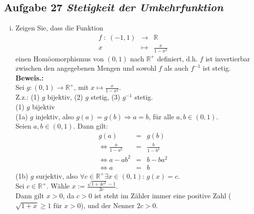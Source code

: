 \subsection*{Aufgabe 27 \mdseries\itshape Stetigkeit der Umkehrfunktion}

\begin{enumerate}[(i)]
   \item Zeigen Sie, dass die Funktion 
        $$\begin{array}{rcl}
            f \; : \; (-1,1) &\longrightarrow& \mathbb{R}\\
                x & \mapsto & \frac{x}{1 - x^2}
        \end{array}$$
        einen Homöomorphismus von $(0,1)$ nach $\mathbb{R}^+$ definiert, d.h. 
        $f$ ist invertierbar zwischen den angegebenen Mengen und sowohl $f$ als auch
        $f^{-1}$ ist stetig.\\

    \textbf{Beweis.:}\\
        Sei $g : (0,1) \to \mathbb{R}^+$, mit $x \mapsto \frac{x}{1 - x^2}$.\\
        Z.z.: (1) $g$ bijektiv, (2) $g$ stetig, (3) $g^{-1}$ stetig. \\

        (1) $g$ bijektiv \\
            (1a) $g$ injektiv, also $g(a) = g(b) \Rightarrow a = b$, für alle $a,b \in (0,1)$. \\
                Seien $a,b \in (0,1)$. Dann gilt:
                \begin{eqnarray*}
                  g(a) &=& g(b) \\
                  \Leftrightarrow \frac{a}{1 - a^2} &=& \frac{b}{1 - b^2} \\
                  \Leftrightarrow a - ab^2 &=& b - ba^2 \\
                  \Leftrightarrow a &=& b
                \end{eqnarray*}
            (1b) $g$ surjektiv, also $\forall c \in \mathbb{R}^+ \exists x \in (0,1):\, g(x) = c$.\\
                Sei $c \in \mathbb{R}^+$. Wähle $x := \frac{\sqrt{1+4c^2}-1}{2c}$. \\
                Dann gilt $x>0$, da $c>0$ ist steht im Zähler immer eine positive Zahl ($\sqrt{1 + x} \geq 1$ für $x > 0$),
		und der Nenner $2c > 0$.\\


\end{enumerate}
